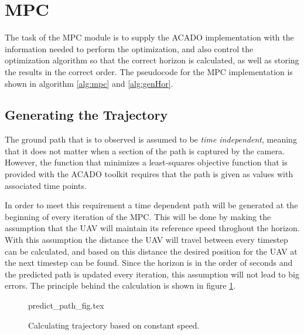 \section{MPC}

The task of the MPC module is to supply the ACADO implementation with the information needed to perform the optimization, and also control the optimization algorithm so that the correct horizon is calculated, as well as storing the results in the correct order. The pseudocode for the MPC implementation is shown in algorithm \ref{alg:mpc} and \ref{alg:genHor}.


\subsection{Generating the Trajectory}

The ground path that is to observed is assumed to be \textit{time independent}, meaning that it does not matter when a section of the path is captured by the camera. However, the function that minimizes a least-squares objective function that is provided with the ACADO toolkit requires that the path is given as values with associated time points.

In order to meet this requirement a time dependent path will be generated at the beginning of every iteration of the MPC. This will be done by making the assumption that the UAV will maintain its reference speed throghout the horizon. With this assumption the distance the UAV will travel between every timestep can be calculated, and based on this distance the desired position for the UAV at the next timestep can be found. Since the horizon is in the order of seconds and the predicted path is updated every iteration, this assumption will not lead to big errors. The principle behind the calculation is shown in figure \ref{fig:predict_path}.

\begin{figure}
	{predict_path_fig.tex}
	\caption{Calculating trajectory based on constant speed.}
	\label{fig:predict_path}
\end{figure}